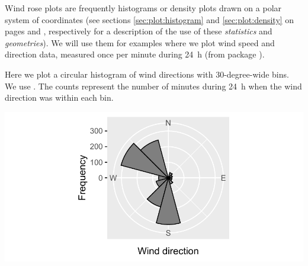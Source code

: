 \documentclass[krantz2]{krantz}\usepackage{knitr}
\begin{document}
Wind rose plots are frequently histograms or density plots drawn on a polar system of coordinates (see sections \ref{sec:plot:histogram} and \ref{sec:plot:density} on pages \pageref{sec:plot:histogram} and \pageref{sec:plot:density}, respectively for a description of the use of these \emph{statistics} and \emph{geometries}). We will use them for examples where we plot wind speed and direction data, measured once per minute during 24~h (from package ).

Here we plot a circular histogram of wind directions with 30-degree-wide bins. We use . The counts represent the number of minutes during 24~h when the wind direction was within each bin.

\begin{knitrout}\footnotesize
{}\color{fgcolor}\begin{kframe}
\begin{alltt}
   \hlopt{+}
  \hlstd{()} \hlopt{+}
  \hlstd{(} \hlstd{=} \hlstd{,}  \hlstd{=} \hlstd{,}  \hlstd{=} \hlstd{,}
            \hlstd{=} \hlstd{,}  \hlstd{=} \hlstd{)} \hlopt{+}
  \hlstd{(} \hlstd{=} \hlstd{)} \hlopt{+}
  \hlstd{(} \hlstd{=} \hlstd{(}\hlstd{,} \hlstd{,} \hlstd{,} \hlstd{),}
                      \hlstd{=} \hlstd{(}\hlstd{,} \hlstd{,} \hlstd{,} \hlstd{),}
                      \hlstd{=} \hlstd{(}\hlstd{,} \hlstd{),}
                      \hlstd{=} \hlstd{(}\hlstd{,} \hlstd{),}
                      \hlstd{=} \hlstd{)}
\end{alltt}
\end{kframe}

{\centering \includegraphics[width=.7\textwidth]{figure/pos-wind-05-1} 

}



\end{knitrout}
\end{document}
